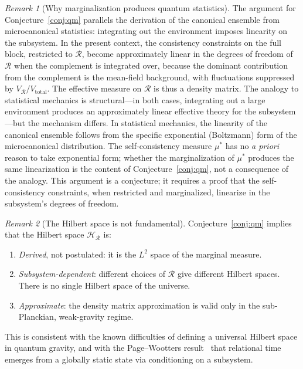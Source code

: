 \documentclass[12pt,a4paper]{article}
\theoremstyle{definition}
\theoremstyle{remark}
\newtheorem{remark}{Remark}
\begin{document}
\begin{remark}[Why marginalization produces quantum statistics]
The argument for Conjecture~\ref{conj:qm} parallels the derivation of the
canonical ensemble from microcanonical statistics: integrating out the
environment imposes linearity on the subsystem. In the present context, the
consistency constraints on the full block, restricted to $\mathcal{R}$, become
approximately linear in the degrees of freedom of $\mathcal{R}$ when the
complement is integrated over, because the dominant contribution from the
complement is the mean-field background, with fluctuations suppressed by
$V_\mathcal{R}/V_{\mathrm{total}}$. The effective measure on $\mathcal{R}$ is
thus a density matrix. The analogy to statistical mechanics is structural---in
both cases, integrating out a large environment produces an approximately linear
effective theory for the subsystem---but the mechanism differs. In statistical
mechanics, the linearity of the canonical ensemble follows from the specific
exponential (Boltzmann) form of the microcanonical distribution. The
self-consistency measure $\mu^*$ has no \textit{a priori} reason to take
exponential form; whether the marginalization of $\mu^*$ produces the same
linearization is the content of Conjecture~\ref{conj:qm}, not a consequence of
the analogy. This argument is a conjecture; it requires a proof that
the self-consistency constraints, when restricted and marginalized, linearize
in the subsystem's degrees of freedom.
\end{remark}

\begin{remark}[The Hilbert space is not fundamental]
Conjecture~\ref{conj:qm} implies that the Hilbert space $\mathcal{H}_\mathcal{R}$
is:
\begin{enumerate}
\item \emph{Derived}, not postulated: it is the $L^2$ space of the marginal measure.
\item \emph{Subsystem-dependent}: different choices of $\mathcal{R}$ give different
Hilbert spaces. There is no single Hilbert space of the universe.
\item \emph{Approximate}: the density matrix approximation is valid only in the
sub-Planckian, weak-gravity regime.
\end{enumerate}
This is consistent with the known difficulties of defining a universal Hilbert
space in quantum gravity, and with the Page--Wootters result~\cite{page_wootters}
that relational time emerges from a globally static state via conditioning on a
subsystem.
\end{remark}
\end{document}
